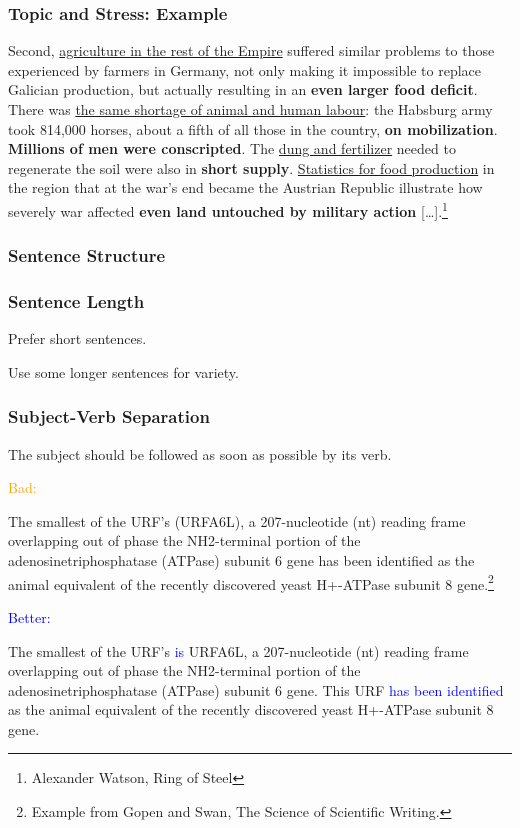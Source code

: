 \documentclass[xetex]{beamer}
\newcommand{\bad}[1]{\textcolor{orange}{#1}}
\newcommand{\good}[1]{\textcolor{blue}{#1}}
\begin{document}
\begin{frame}
  \frametitle{Topic and Stress: Example}

  \small
  Second, \underline{agriculture in the rest of the Empire} suffered similar problems to those experienced by farmers in Germany, not only making it impossible to replace Galician production, but actually resulting in an \textbf{even larger food deficit}.
  There was \underline{the same shortage of animal and human labour}: the Habsburg army took 814,000 horses, about a fifth of all those in the country, \textbf{on mobilization}.
  \textbf{Millions of men were conscripted}.
  The \underline{dung and fertilizer} needed to regenerate the soil were also in \textbf{short supply}.
  \underline{Statistics for food production} in the region that at the war's end became the Austrian Republic illustrate how severely war affected \textbf{even land untouched by military action} [\dots].\footnote{Alexander Watson, Ring of Steel}
\end{frame}


\subsubsection{Sentence Structure}

\begin{frame}
  \frametitle{Sentence Length}

  Prefer short sentences.

  \medskip

  Use some longer sentences for variety.
\end{frame}

\begin{frame}
  \frametitle{Subject-Verb Separation}

  The subject should be followed as soon as possible by its verb.

  \medskip
  \pause

  \bad{Bad:}

  {
    \small
    The smallest of the URF's (URFA6L), a 207-nucleotide (nt) reading frame overlapping out of phase the NH2-terminal portion of the adenosinetriphosphatase (ATPase) subunit 6 gene has been identified as the animal equivalent of the recently discovered yeast H+-ATPase subunit 8 gene.\footnote{Example from Gopen and Swan, The Science of Scientific Writing.}
  }

  \medskip
  \pause

  \good{Better:}

  {
    \small
    The smallest of the URF's \good{is} URFA6L, a 207-nucleotide (nt) reading frame overlapping out of phase the NH2-terminal portion of the adenosinetriphosphatase (ATPase) subunit 6 gene.
    This URF \good{has been identified} as the animal equivalent of the recently discovered yeast H+-ATPase subunit 8 gene.
  }
\end{frame}
\end{document}
